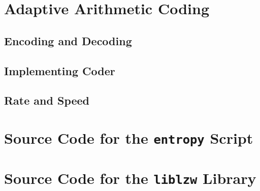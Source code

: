 \documentclass[a4paper, twocolumn]{article}
\begin{document}
    \section{Adaptive Arithmetic Coding} \label{sec:adaptive_arithmetic_coding}
        \subsection{Encoding and Decoding} \label{sec:aac_encoding_decoding}
        \subsection{Implementing Coder} \label{sec:aac_implementing_coder}
        \subsection{Rate and Speed} \label{sec:aac_rate_and_speed}

    \appendix \onecolumn

    \clearpage
    \section{Source Code for the \texttt{entropy} Script} \label{sec:script}

    

    \section{Source Code for the \texttt{liblzw} Library} \label{sec:liblzw}

    
    

    
    

    
    
    
    
    
    
    
\end{document}

